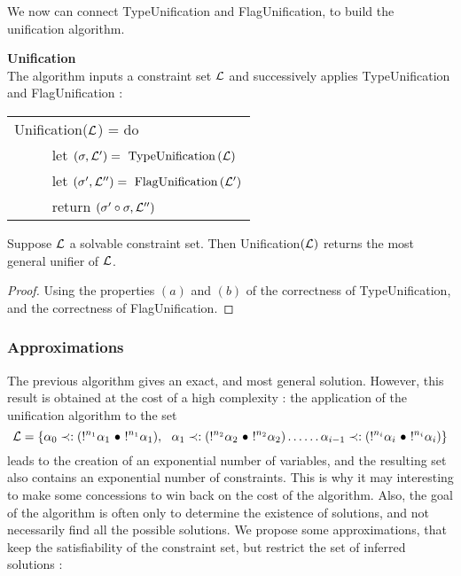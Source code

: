 We now can connect TypeUnification and FlagUnification, to build the unification algorithm.

\begin{defn} {\bf Unification} \\
	The algorithm inputs a constraint set $\mathcal{L}$ and successively applies TypeUnification and FlagUnification :
		\begin{center}
		\begin{tabular}{l}
			Unification($\mathcal{L}$) = do \\
			~~ ~~ let $(\sigma, \mathcal{L}') = \text{ TypeUnification} \,(\mathcal{L})$ \\
			~~ ~~ let $(\sigma', \mathcal{L}'') = \text{ FlagUnification} \,(\mathcal{L}')$ \\
			~~ ~~ return $(\sigma' \circ \sigma, \mathcal{L}'')$
		\end{tabular}
		\end{center}
\end{defn}

\begin{lemma} Suppose $\mathcal{L}$ a solvable constraint set. Then Unification$(\mathcal{L})$ returns the most general unifier of $\mathcal{L}$.
	\begin{proof}
		Using the properties $(a)$ and $(b)$ of the correctness of TypeUnification, and the correctness of FlagUnification.
	\end{proof}
\end{lemma}

\subsubsection{Approximations}

The previous algorithm gives an exact, and most general solution. However, this result is obtained at the cost of a high complexity :
the application of the unification algorithm to the set
{ \footnotesize
	$$\mathcal{L} = \{\alpha_0 \prec: (!^{n_1}\alpha_1 ~\bullet~ !^{n_1}\alpha_1), ~~ 
	\alpha_1 \prec: (!^{n_2}\alpha_2 ~\bullet~ !^{n_2}\alpha_2) \dots \dots \alpha_{i-1} \prec: (!^{n_i}\alpha_i ~\bullet~ !^{n_i}\alpha_{i}) \}$$ }
leads to the creation of an exponential number of variables, and the resulting set also contains an exponential number of
constraints.
This is why it may interesting to make some concessions to win back on the cost of the algorithm. Also, the goal of the algorithm is
often only to determine the existence of solutions, and not necessarily find all the possible solutions.
We propose some approximations, that keep the satisfiability of the constraint set, but restrict the set of inferred solutions :
	
